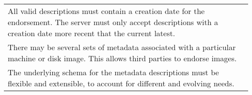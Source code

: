 \begin{table}
\begin{center}
\begin{tabular}{p{}}
\\ All valid descriptions must contain a creation date for the
  endorsement.  The server must only accept descriptions with a
  creation date more recent that the current latest.

\\ There may be several sets of metadata associated with a
  particular machine or disk image. This allows third parties to
  endorse images.

\\ The underlying schema for the metadata descriptions must be
  flexible and extensible, to account for different and evolving
  needs.

\\
\hline\hline
\end{tabular}
\end{center}
\end{table}
